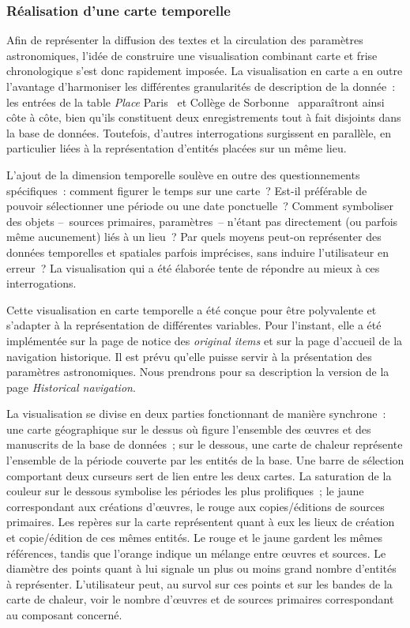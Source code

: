 \documentclass[a4paper,12pt,twoside]{book}
\newcommand{\eng}{\emph}
\newcommand{\ois}{\eng{original items}\xspace}
\newcommand{\bdd}{base de données\xspace}
\newcommand{\g}[1]{\og#1~\fg}
\begin{document}
			\subsubsection{Réalisation d'une carte temporelle}
Afin de représenter la diffusion des textes et la circulation des paramètres astronomiques, l'idée de construire une visualisation combinant carte et frise chronologique s'est donc rapidement imposée. La visualisation en carte a en outre l'avantage d'harmoniser les différentes granularités de description de la donnée~: les entrées de la table \eng{Place} \g{Paris} et \g{Collège de Sorbonne} apparaîtront ainsi côte à côte, bien qu'ils constituent deux enregistrements tout à fait disjoints dans la \bdd. Toutefois, d'autres interrogations surgissent en parallèle, en particulier liées à la représentation d'entités placées sur un même lieu.

L'ajout de la dimension temporelle soulève en outre des questionnements spécifiques~: comment figurer le temps sur une carte~? Est-il préférable de pouvoir sélectionner une période ou une date ponctuelle~? Comment symboliser des objets –~sources primaires, paramètres~– n'étant pas directement (ou parfois même aucunement) liés à un lieu~? Par quels moyens peut-on représenter des données temporelles et spatiales parfois imprécises, sans induire l'utilisateur en erreur~? La visualisation qui a été élaborée tente de répondre au mieux à ces interrogations.

Cette visualisation en carte temporelle a été conçue pour être polyvalente et s'adapter à la représentation de différentes variables. Pour l'instant, elle a été implémentée sur la page de notice des \ois et sur la page d'accueil de la navigation historique. Il est prévu qu'elle puisse servir à la présentation des paramètres astronomiques. Nous prendrons pour sa description la version de la page \eng{Historical navigation}.

La visualisation se divise en deux parties fonctionnant de manière synchrone~: une carte géographique sur le dessus où figure l'ensemble des œuvres et des manuscrits de la \bdd~; sur le dessous, une carte de chaleur représente l'ensemble de la période couverte par les entités de la base. Une barre de sélection comportant deux curseurs sert de lien entre les deux cartes. La saturation de la couleur sur le dessous symbolise les périodes les plus prolifiques~; le jaune correspondant aux créations d'œuvres, le rouge aux copies/éditions de sources primaires. Les repères sur la carte représentent quant à eux les lieux de création et copie/édition de ces mêmes entités. Le rouge et le jaune gardent les mêmes références, tandis que l'orange indique un mélange entre œuvres et sources. Le diamètre des points quant à lui signale un plus ou moins grand nombre d'entités à représenter. L'utilisateur peut, au survol sur ces points et sur les bandes de la carte de chaleur, voir le nombre d'œuvres et de sources primaires correspondant au composant concerné.
\end{document}
